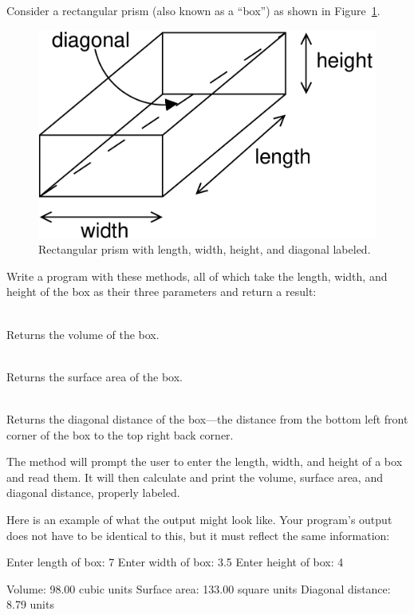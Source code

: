 \begin{exercise}
Consider a rectangular prism (also known as a ``box'') as shown in Figure~\ref{fig.rectangular-prism}.

\begin{figure}[!h]
\begin{center}
\includegraphics[scale=0.4]{figs/rectangular-prism.pdf}
\caption{Rectangular prism with length, width, height, and diagonal labeled.}
\label{fig.rectangular-prism}
\end{center}
\end{figure}

Write a program with these methods, all of which take the length, width, and height of the box as their three parameters and return a  result:

\begin{description}
\item {} \hfill \\ Returns the volume of the box.
\item {} \hfill \\ Returns the surface area of the box.
\item {} \hfill \\ Returns the diagonal distance of the box---the distance from the bottom left front corner of the box to the top right back corner.
\end{description}

The  method will prompt the user to enter the length, width, and height of a box and read them. It will then calculate and print the volume, surface area, and diagonal distance, properly labeled.

Here is an example of what the output might look like. Your program's output does not have to be identical to this, but it must reflect the same information:

\begin{stdout}
Enter length of box: 7
Enter width of box: 3.5
Enter height of box: 4

Volume: 98.00 cubic units
Surface area: 133.00 square units
Diagonal distance: 8.79 units
\end{stdout}

\end{exercise}

